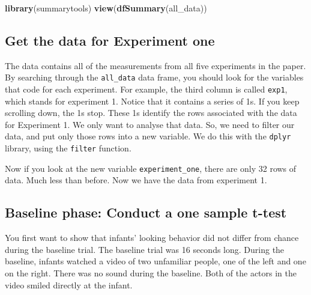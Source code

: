 \documentclass[]{book}
\newenvironment{Shaded}{\begin{snugshade}}{\end{snugshade}}
\newcommand{\KeywordTok}[1]{\textcolor[rgb]{0.13,0.29,0.53}{\textbf{{#1}}}}
\newcommand{\DecValTok}[1]{\textcolor[rgb]{0.00,0.00,0.81}{{#1}}}
\newcommand{\StringTok}[1]{\textcolor[rgb]{0.31,0.60,0.02}{{#1}}}
\newcommand{\NormalTok}[1]{{#1}}
\theoremstyle{definition}
\theoremstyle{definition}
\theoremstyle{definition}
\theoremstyle{remark}
\begin{document}
\begin{Shaded}
\begin{Highlighting}[]
\KeywordTok{library}\NormalTok{(summarytools)}
\KeywordTok{view}\NormalTok{(}\KeywordTok{dfSummary}\NormalTok{(all_data))}
\end{Highlighting}
\end{Shaded}

\subsection{Get the data for Experiment
one}\label{get-the-data-for-experiment-one}

The data contains all of the measurements from all five experiments in
the paper. By searching through the \texttt{all\_data} data frame, you
should look for the variables that code for each experiment. For
example, the third column is called \texttt{exp1}, which stands for
experiment 1. Notice that it contains a series of 1s. If you keep
scrolling down, the 1s stop. These 1s identify the rows associated with
the data for Experiment 1. We only want to analyse that data. So, we
need to filter our data, and put only those rows into a new variable. We
do this with the \texttt{dplyr} library, using the \texttt{filter}
function.

\begin{Shaded}
\end{Shaded}

Now if you look at the new variable \texttt{experiment\_one}, there are
only 32 rows of data. Much less than before. Now we have the data from
experiment 1.

\subsection{Baseline phase: Conduct a one sample
t-test}\label{baseline-phase-conduct-a-one-sample-t-test}

You first want to show that infants' looking behavior did not differ
from chance during the baseline trial. The baseline trial was 16 seconds
long. During the baseline, infants watched a video of two unfamiliar
people, one of the left and one on the right. There was no sound during
the baseline. Both of the actors in the video smiled directly at the
infant.
\end{document}
